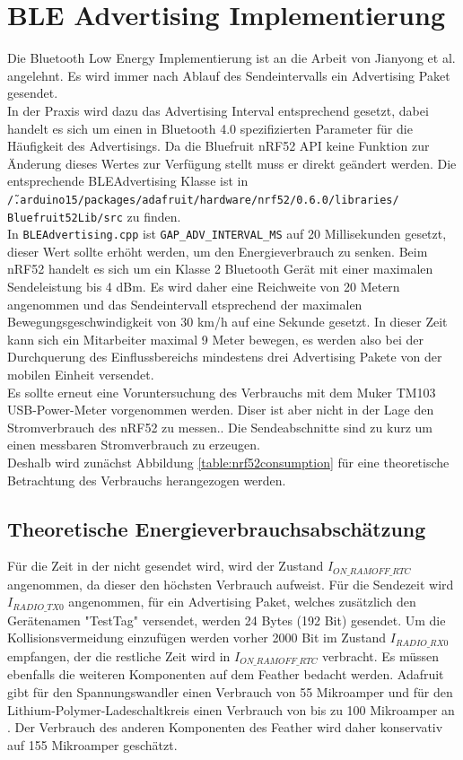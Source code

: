 \section{BLE Advertising Implementierung}
\label{ch:phase3:sec:advertising}
Die Bluetooth Low Energy Implementierung ist an die Arbeit von Jianyong et al. angelehnt.
Es wird immer nach Ablauf des Sendeintervalls ein Advertising Paket gesendet.\\
In der Praxis wird dazu das Advertising Interval entsprechend gesetzt, dabei handelt es sich um einen in Bluetooth 4.0 spezifizierten Parameter für die Häufigkeit des Advertisings.
Da die Bluefruit nRF52 API keine Funktion zur Änderung dieses Wertes zur Verfügung stellt muss er direkt geändert werden.
Die entsprechende BLEAdvertising Klasse ist in \\\texttt{\~/.arduino15/packages/adafruit/hardware/nrf52/0.6.0/libraries/}\\\texttt{Bluefruit52Lib/src} zu finden. \\
In \texttt{BLEAdvertising.cpp} ist \texttt{GAP\_ADV\_INTERVAL\_MS} auf 20 Millisekunden gesetzt, dieser Wert sollte erhöht werden, um den Energieverbrauch zu senken.
Beim nRF52 handelt es sich um ein Klasse 2 Bluetooth Gerät mit einer maximalen Sendeleistung bis 4 dBm.
Es wird daher eine Reichweite von 20 Metern angenommen und das Sendeintervall etsprechend der maximalen Bewegungsgeschwindigkeit von 30 km/h auf eine Sekunde gesetzt. 
In dieser Zeit kann sich ein Mitarbeiter maximal 9 Meter bewegen, es werden also bei der Durchquerung des Einflussbereichs mindestens drei Advertising Pakete von der mobilen Einheit versendet.\\
Es sollte erneut eine Voruntersuchung des Verbrauchs mit dem Muker TM103 USB-Power-Meter vorgenommen werden.
Diser ist aber nicht in der Lage den Stromverbrauch des nRF52 zu messen..
Die Sendeabschnitte sind zu kurz um einen messbaren Stromverbrauch zu erzeugen.\\
Deshalb wird zunächst Abbildung \ref{table:nrf52consumption} für eine theoretische Betrachtung des Verbrauchs herangezogen werden. 

\subsection{Theoretische Energieverbrauchsabschätzung}
Für die Zeit in der nicht gesendet wird, wird der Zustand $I_{ON\_RAMOFF\_RTC}$ angenommen, da dieser den höchsten Verbrauch aufweist.
Für die Sendezeit wird $I_{RADIO\_TX0}$ angenommen, für ein Advertising Paket, welches zusätzlich den Gerätenamen "{}TestTag"{} versendet, werden 24 Bytes (192 Bit) gesendet.
Um die Kollisionsvermeidung einzufügen werden vorher 2000 Bit im Zustand $I_{RADIO\_RX0}$ empfangen, der die restliche Zeit wird in $I_{ON\_RAMOFF\_RTC}$ verbracht. 
Es müssen ebenfalls die weiteren Komponenten auf dem Feather bedacht werden. 
Adafruit gibt für den Spannungswandler einen Verbrauch von 55 Mikroamper und für den Lithium-Polymer-Ladeschaltkreis einen Verbrauch von bis zu 100 Mikroamper an \cite{fried2016lora}. 
Der Verbrauch des anderen Komponenten des Feather wird daher konservativ auf 155 Mikroamper geschätzt.\\[1cm]

